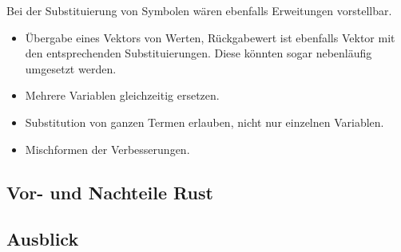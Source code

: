 \documentclass[11pt,a4paper, ngerman]{article}
\begin{document}
Bei der Substituierung von Symbolen wären ebenfalls Erweitungen vorstellbar.
\begin{itemize}
    \item Übergabe eines Vektors von Werten, Rückgabewert ist ebenfalls Vektor mit den entsprechenden Substituierungen. Diese könnten sogar nebenläufig umgesetzt werden.
    \item Mehrere Variablen gleichzeitig ersetzen.
    \item Substitution von ganzen Termen erlauben, nicht nur einzelnen Variablen.
    \item Mischformen der Verbesserungen.
\end{itemize}
\subsection{Vor- und Nachteile Rust}
\subsection{Ausblick}


\newpage

\raggedright

\end{document}
